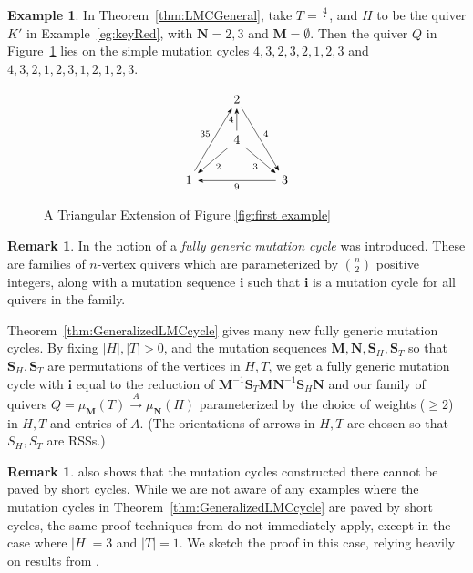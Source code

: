 \documentclass[11pt, letterpaper]{amsart}
\theoremstyle{definition}
\newtheorem{remark}[theorem]{Remark}
\newtheorem{example}[theorem]{Example}
\numberwithin{equation}{section}
\begin{document}
\begin{example}
In Theorem~\ref{thm:LMCGeneral}, take $T = \stackrel{4}{\cdot}$, and $H$ to be the quiver $K'$ in Example~\ref{eg:keyRed}, with $\mathbf N = 2,3$ and $\mathbf M = \emptyset$.
Then the quiver $Q$ in Figure~\ref{fig:keyRed triang} lies on the simple mutation cycles $4,3,2,3,2,1,2,3$ and $4,3,2,1,2,3,1,2,1,2,3$.
\begin{figure}[ht]
    \centering
    \[\begin{tikzcd}[every arrow/.append style = {-{Stealth}}]
     & 2 & \\
     & 4 & \\
    1 &  & 3 
    \arrow[from=3-1,to=1-2,"35"]
    \arrow[from=1-2,to=3-3,"4"]
    \arrow[from=3-3,to=3-1,"9"]
    \arrow[from=2-2,to=3-1,"2"]
    \arrow[from=2-2,to=3-3,"3"']
    \arrow[from=2-2,to=1-2,"4"]
    \end{tikzcd}\]
    \caption{A Triangular Extension of Figure \ref{fig:first example}}
    \label{fig:keyRed triang}
\end{figure}
\end{example}

\begin{remark}
In \cite[Section~8]{LMC} the notion of a \emph{fully generic mutation cycle} was introduced.
These are families of $n$-vertex quivers which are parameterized by $\binom n 2$ positive integers, along with a mutation sequence $\mathbf i$ such that $\mathbf i$ is a mutation cycle for all quivers in the family.

Theorem~\ref{thm:GeneralizedLMCcycle} gives many new fully generic mutation cycles. 
By fixing $|H|, |T| > 0$, and the mutation sequences $\mathbf M, \mathbf N, \mathbf S_H, \mathbf S_T$ so that $\mathbf S_H, \mathbf S_T$ are permutations of the vertices in $H, T$, we get a fully generic mutation cycle with $\mathbf i$ equal to the reduction of $\mathbf M^{-1}\mathbf S_T \mathbf M \mathbf N^{-1} \mathbf S_H \mathbf N$ and our family of quivers $Q = {\mu_{\mathbf M}(T) \stackrel{A}\rightarrow \mu_{\mathbf N}(H)}$ parameterized by the choice of weights ($\geq 2$) in $H, T$ and entries of $A$. (The orientations of arrows in $H,T$ are chosen so that $S_H, S_T$ are RSSs.) %
\end{remark}



\begin{remark}
\cite[Theorem~1.1]{LMC} also shows that the mutation cycles constructed there cannot be paved by short cycles.
While we are not aware of any examples where the mutation cycles in Theorem~\ref{thm:GeneralizedLMCcycle} are paved by short cycles, the same proof techniques from \cite{LMC} do not immediately apply, except in the case where $|H|=3$ and $|T|=1$.
We sketch the proof in this case, relying heavily on results from \cite{LMC}.
\end{remark}
\end{document}
